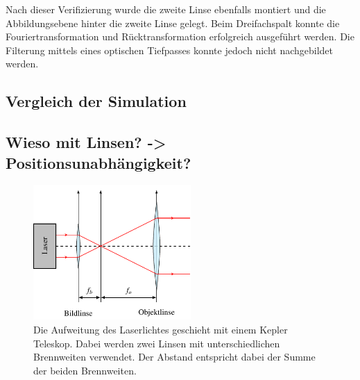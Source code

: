 Nach dieser Verifizierung wurde die zweite Linse ebenfalls montiert und die Abbildungsebene hinter die zweite Linse gelegt.
Beim Dreifachspalt konnte die Fouriertransformation und Rücktransformation erfolgreich ausgeführt werden.
Die Filterung mittels eines optischen Tiefpasses konnte jedoch nicht nachgebildet werden.

\subsection{Vergleich der Simulation}

\subsection{Wieso mit Linsen? -> Positionsunabhängigkeit?}

\begin{figure}
    \centering
    \includegraphics[width=60mm]{papers/opt/images/laserAufweiten.pdf}
    \caption{Die Aufweitung des Laserlichtes geschieht mit einem Kepler Teleskop.
        Dabei werden zwei Linsen mit unterschiedlichen Brennweiten verwendet.
        Der Abstand entspricht dabei der Summe der beiden Brennweiten.}
    \label{opt:fig:laserAufweiten}
\end{figure}
